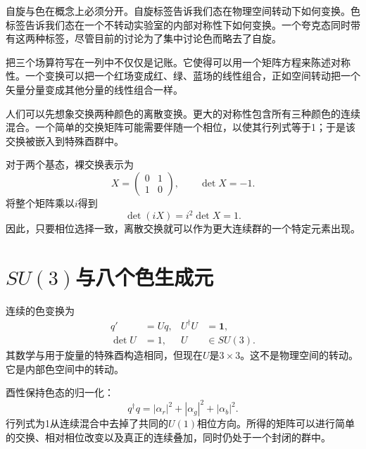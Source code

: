 自旋与色在概念上必须分开。自旋标签告诉我们态在物理空间转动下如何变换。色标签告诉我们态在一个不转动实验室的内部对称性下如何变换。一个夸克态同时带有这两种标签，尽管目前的讨论为了集中讨论色而略去了自旋。

把三个场算符写在一列中不仅仅是记账。它使得可以用一个矩阵方程来陈述对称性。一个变换可以把一个红场变成红、绿、蓝场的线性组合，正如空间转动把一个矢量分量变成其他分量的线性组合一样。

人们可以先想象交换两种颜色的离散变换。更大的对称性包含所有三种颜色的连续混合。一个简单的交换矩阵可能需要伴随一个相位，以使其行列式等于1；于是该交换被嵌入到特殊酉群中。

对于两个基态，裸交换表示为
\begin{equation}
X=
\begin{pmatrix}0&1\\1&0\end{pmatrix},
\qquad
\det X=-1.
\end{equation}
将整个矩阵乘以\(i\)得到
\begin{equation}
\det(iX)=i^2\det X=1.
\end{equation}
因此，只要相位选择一致，离散交换就可以作为更大连续群的一个特定元素出现。

\begin{classroomqa}
\end{classroomqa}

\section{\texorpdfstring{\(SU(3)\)}{SU(3)}与八个色生成元}

连续的色变换为
\begin{equation}
\begin{aligned}
q'&=Uq,
&
U^\dagger U&=\boldsymbol 1,
\\
\det U&=1,
&
U&\in SU(3).
\end{aligned}
\label{eq:l3-su3-action}
\end{equation}
其数学与用于旋量的特殊酉构造相同，但现在\(U\)是\(3\times3\)。这不是物理空间的转动。它是内部色空间中的转动。

酉性保持色态的归一化：
\begin{equation}
q^\dagger q
=|\alpha_r|^2+|\alpha_g|^2+|\alpha_b|^2.
\end{equation}
行列式为1从连续混合中去掉了共同的\(U(1)\)相位方向。所得的矩阵可以进行简单的交换、相对相位改变以及真正的连续叠加，同时仍处于一个封闭的群中。

